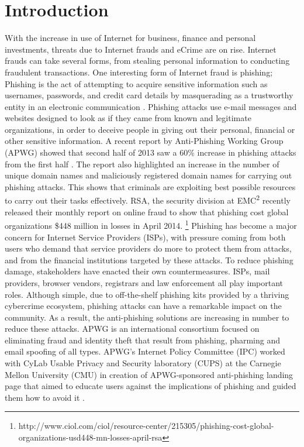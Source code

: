 \documentclass[conference]{IEEEtran}
\begin{document}
\section{Introduction}
With the increase in use of Internet for business, finance and personal investments, threats due to Internet frauds and eCrime are on rise. Internet frauds can take several forms, from stealing personal information to conducting fraudulent transactions. One interesting form of Internet fraud is phishing; Phishing is the act of attempting to acquire sensitive information such as usernames, passwords, and credit card details by masquerading as a trustworthy entity in an electronic communication \cite{jakobsson}. Phishing attacks use e-mail messages and websites designed to look as if they came from known and legitimate organizations, in order to deceive people in giving out their personal, financial or other sensitive information. A recent report by Anti-Phishing Working Group (APWG) showed that second half of 2013 saw a 60\% increase in phishing attacks from the first half \cite{apwg}. The report also highlighted an increase in the number of unique domain names and maliciously registered domain names for carrying out phishing attacks. This shows that criminals are exploiting best possible resources to carry out their tasks effectively. RSA, the security division at EMC\textsuperscript{2} recently released their monthly report on online fraud to show that phishing cost global organizations \$448 million in losses in April 2014. \footnote{http://www.ciol.com/ciol/resource-center/215305/phishing-cost-global-organizations-usd448-mn-losses-april-rsa} \newline\indent
Phishing has become a major concern for Internet Service Providers (ISPs), with pressure coming from both users who demand that service providers do more to protect them from attacks, and from the financial institutions targeted by these attacks. To reduce phishing damage, stakeholders have enacted their own countermeasures. ISPs, mail providers, browser vendors, registrars and law enforcement all play important roles. Although simple, due to off-the-shelf phishing kits provided by a thriving cybercrime ecosystem, phishing attacks can have a remarkable impact on the community. As a result, the anti-phishing solutions are increasing in number to reduce these attacks. APWG is an international consortium focused on eliminating fraud and identity theft that result from phishing, pharming and email spoofing of all types. APWG's Internet Policy Committee (IPC) worked with CyLab Usable Privacy and Security laboratory (CUPS) at the Carnegie Mellon University (CMU) in creation of APWG-sponsored anti-phishing landing page that aimed to educate users against the implications of phishing and guided them how to avoid it \cite{pk-404}.
\end{document}
